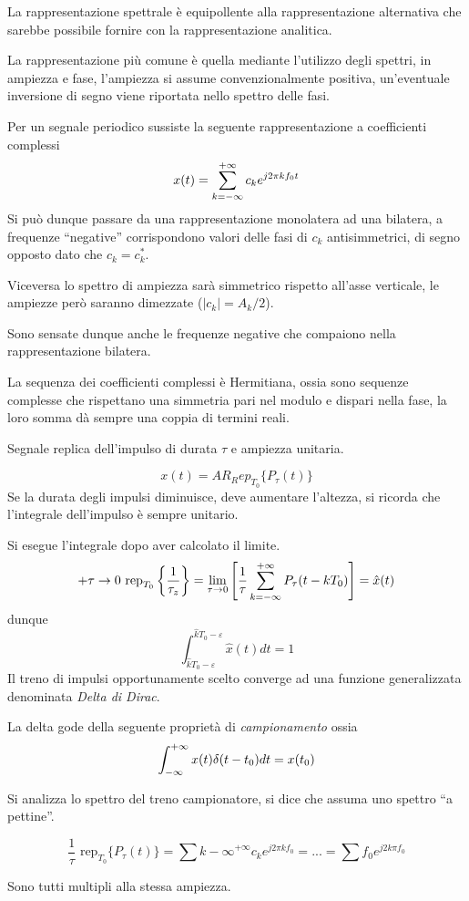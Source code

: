 
La rappresentazione spettrale è equipollente alla rappresentazione alternativa
che sarebbe possibile fornire con la rappresentazione analitica.

La rappresentazione più comune è quella mediante l'utilizzo degli spettri, in
ampiezza e fase, l'ampiezza si assume convenzionalmente positiva, un'eventuale
inversione di segno viene riportata nello spettro delle fasi.

Per un segnale periodico sussiste la seguente rappresentazione a coefficienti
complessi
$$
x(t) = \sum_{k=-\infty}^{+\infty} c_k e^{j 2\pi k f_0 t}
$$
Si può dunque passare da una rappresentazione monolatera ad una bilatera, a
frequenze ``negative'' corrispondono valori delle fasi di $c_k$
antisimmetrici, di segno opposto dato che $c_k = c_k^*$.

Viceversa lo spettro di ampiezza sarà simmetrico rispetto all'asse verticale,
le ampiezze però saranno dimezzate ($|c_k| = A_k/2$).

Sono sensate dunque anche le frequenze negative che compaiono nella
rappresentazione bilatera.

La sequenza dei coefficienti complessi è Hermitiana, ossia sono sequenze
complesse che rispettano una simmetria pari nel modulo e dispari nella fase, la
loro somma dà sempre una coppia di termini reali.


Segnale replica dell'impulso di durata $\tau$ e ampiezza unitaria.


$$
x(t)=AR_Rep_{T_0}\{P_\tau(t)\}
$$
Se la durata degli impulsi diminuisce, deve aumentare l'altezza, si ricorda che
l'integrale dell'impulso è sempre unitario.

Si esegue l'integrale dopo aver calcolato il limite.
$$
+{\tau\to0} \text{ rep}_{T_0} \left\{\frac{1}{\tau_z}\right\} = \lim_{\tau \to
0}
\left[ \frac{1}{\tau} \sum_{k=-\infty}^{+\infty}  P_\tau(t-kT_0) \right] =
\hat{x}(t)
$$
dunque
$$
\int_{\hat{k}T_0-\varepsilon}^{\hat{k}T_0-\varepsilon} \hat{x}(t)dt = 1
$$
Il treno di impulsi opportunamente scelto converge ad una funzione
generalizzata denominata \textit{Delta di Dirac}.

La delta gode della seguente proprietà di \textit{campionamento}
ossia
$$
\int_{-\infty}^{+\infty} x(t)
\delta(t-t_0) dt = x(t_0)
$$

Si analizza lo spettro del treno campionatore, si dice che assuma uno spettro
``a pettine''.

$$
\frac{1}{\tau} \text{ rep}_{T_0} \{P_\tau(t)\} = \sum{k-\infty}^{+\infty} c_k
e^{j2\pi k f_0} = ... = \sum f_0e^{j2k\pi f_0}
$$

Sono tutti multipli alla stessa ampiezza.

